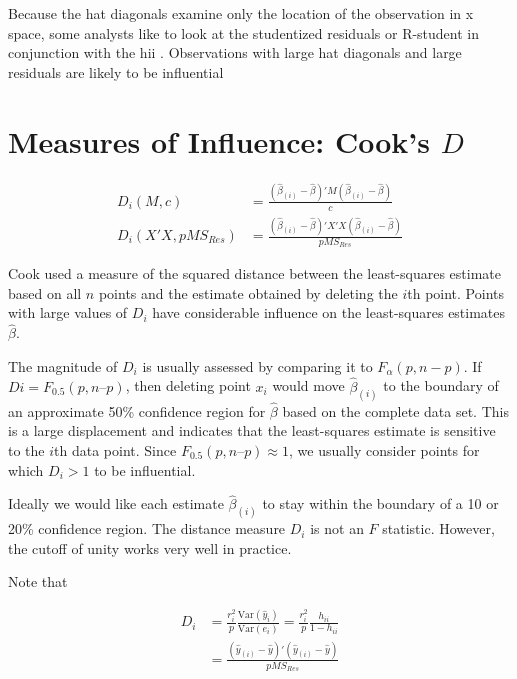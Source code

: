 \documentclass[12pt]{article}
\begin{document}
Because the hat
diagonals examine only the location of the observation in x space,
some analysts like to look at the studentized residuals or R-student in
conjunction with the hii
. Observations with large hat diagonals and
large residuals are likely to be influential

\section{Measures of Influence: Cook's $D$}

$$
\begin{aligned}
D_i (M,c) &= \frac{  (\hat{\beta}_{(i)} - \hat{\beta})' M (\hat{\beta}_{(i)} - \hat{\beta})  }{c} \\[10pt]
D_i (X'X, pMS_{Res}) &= \frac{  (\hat{\beta}_{(i)} - \hat{\beta})' X'X (\hat{\beta}_{(i)} - \hat{\beta})  }{pMS_{Res}}
\end{aligned}
$$

Cook used a measure of the squared distance between the least-squares estimate based on all $n$ points and the estimate obtained by deleting the $i$th point. Points with large values of $D_i$ have considerable influence on the least-squares estimates $\hat{\beta}$. 

The magnitude of $D_i$ is usually assessed by comparing it to $F_\alpha(p, n-p)$. If $Di = F_0.5(p , n–p)$, then deleting point $x_i$ would move $\hat{\beta}_{(i)}$ to the boundary of an approximate 50\% confidence region for $\hat{\beta}$ based on the complete data set. This is a large displacement and indicates that the least-squares estimate is sensitive to the $i$th data point. Since $F_0.5(p , n–p) \approx 1$, we usually consider points for which $D_i > 1$ to be influential.

Ideally we would like each estimate $\hat{\beta}_{(i)}$ to stay within the boundary of a 10 or 20\% confidence region. The distance
measure $D_i$ is not an $F$ statistic. However, the cutoff of unity works very well in practice.

Note that 

$$
\begin{aligned}
D_i &= \frac{r_i^2}{p} \frac{\mathrm{Var}(\hat{y}_i)}{\mathrm{Var}(e_i)} = \frac{r_i^2}{p} \frac{h_{ii}}{1-h_{ii}} \\[8pt]
&=\frac{(\hat{y}_{(i)} - \hat{y})'(\hat{y}_{(i)} - \hat{y})}{p MS_{Res}}
\end{aligned}
$$
\end{document}
